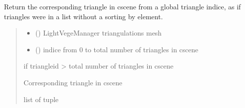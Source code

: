\documentclass[letterpaper,10pt,english]{sphinxmanual}
\begin{document}
\begin{fulllineitems}
\label{\detokenize{reference:trianglesmesh.globalid_to_triangle}}
\pysigstartsignatures
{}
\pysigstopsignatures
\sphinxAtStartPar
Return the corresponding triangle in cscene from a global triangle indice,
as if triangles were in a list without a sorting by element.
\begin{quote}\begin{description}
\begin{itemize}
\item {} 
\sphinxAtStartPar
{} () \textendash{} LightVegeManager triangulations mesh

\item {} 
\sphinxAtStartPar
{} () \textendash{} indice from 0 to total number of triangles in cscene

\end{itemize}

\sphinxAtStartPar
{} \textendash{} if triangleid \textgreater{} total number of triangles in cscene

\sphinxAtStartPar
Corresponding triangle in cscene

\sphinxAtStartPar
list of tuple

\end{description}\end{quote}

\end{fulllineitems}

\end{document}
